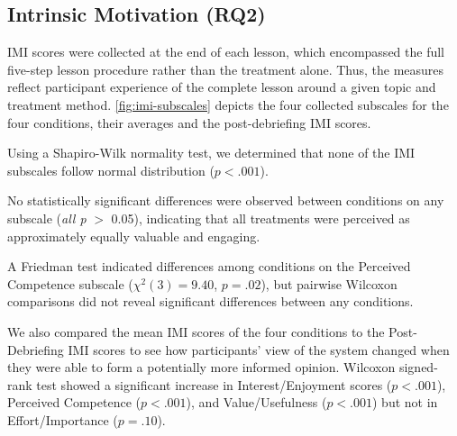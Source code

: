 \documentclass[sigconf]{acmart}
\begin{document}
\subsection{Intrinsic Motivation (RQ2)}


IMI scores were collected at the end of each lesson, which encompassed the full five-step lesson procedure rather than the treatment alone.
Thus, the measures reflect participant experience of the complete lesson around a given topic and treatment method. \autoref{fig:imi-subscales}
 depicts the four collected subscales for the four conditions, their averages and the post-debriefing IMI scores. 

Using a Shapiro-Wilk normality test, we determined that none of the IMI subscales follow normal distribution ($p < .001$).

No statistically significant differences were observed between conditions on any subscale (\textit{all p} $>$ 0.05), indicating that
all treatments were perceived as approximately equally valuable and engaging.

A Friedman test indicated differences among conditions on the Perceived Competence subscale ($\chi^2(3) = 9.40$, $p = .02$), but pairwise Wilcoxon comparisons did not reveal significant differences between any conditions.

We also compared the mean IMI scores of the four conditions to the Post-Debriefing IMI scores to see how participants' view of the system changed when they were able to form a potentially more informed opinion.
Wilcoxon signed-rank test showed a significant increase in Interest/Enjoyment scores ($p < .001$), Perceived Competence ($p< .001$), and Value/Usefulness ($p<.001$) but not in Effort/Importance ($p = .10$).
\end{document}

